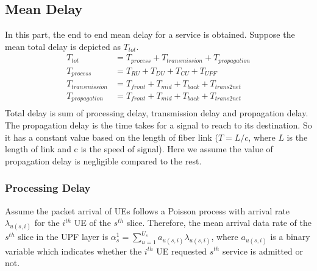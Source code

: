 \documentclass[conference]{IEEEtran}
\begin{document}
\subsection{Mean Delay}
In this part, the end to end mean delay for a service is obtained.
Suppose the mean total delay is depicted as $T_{tot}$.
\begin{equation}
\begin{split}
T_{tot} &=  T_{process} + T_{transmission} + T_{propagation}\\
T_{process} &=  T_{RU} + T_{DU} + T_{CU} + T_{UPF}\\
T_{transmission} &= T_{front} + T_{mid} + T_{back} + T_{trans2net} \\
T_{propagation} &= T_{front} + T_{mid} + T_{back} + T_{trans2net} \\
\end{split}
\end{equation}
Total delay is sum of processing delay, transmission delay and propagation delay. 
The propagation delay is the time takes for a signal to reach to its destination. So it has a constant value based on the length of fiber link ($T = L/c$, where $L$ is the length of link and c is the speed of signal).
Here we assume the value of propagation delay is negligible compared to the rest.
\subsubsection{Processing Delay}
Assume the packet arrival of UEs follows a Poisson process with arrival rate $\lambda_{u(s,i)}$ for the $i^{th}$ UE of the $s^{th}$ slice.
Therefore, the mean arrival data rate of the $s^{th}$ slice in the UPF layer is $\alpha_{s}^1 = \sum_{u=1}^{U_s}a_{u(s,i)}\lambda_{u(s,i)}$, where $a_{u(s,i)}$ is a binary variable which indicates whether the $i^{th}$ UE requested $s^{th}$ service is admitted or not.
\end{document}
